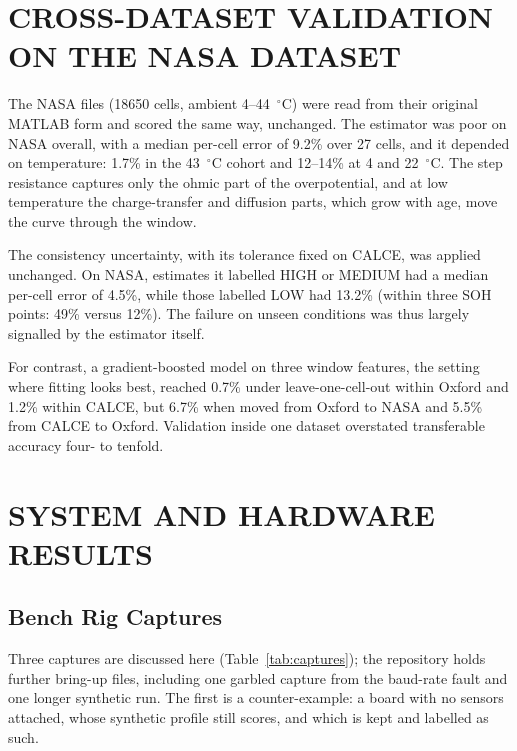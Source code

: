 \section{CROSS-DATASET VALIDATION ON THE NASA DATASET}
\label{sec:res-xds}

The NASA files (18650 cells, ambient 4--44~$^\circ$C) were read from their original MATLAB form and scored the same way, unchanged. The estimator was poor on NASA overall, with a median per-cell error of 9.2\% over 27 cells, and it depended on temperature: 1.7\% in the 43~$^\circ$C cohort and 12--14\% at 4 and 22~$^\circ$C. The step resistance captures only the ohmic part of the overpotential, and at low temperature the charge-transfer and diffusion parts, which grow with age, move the curve through the window.

The consistency uncertainty, with its tolerance fixed on CALCE, was applied unchanged. On NASA, estimates it labelled HIGH or MEDIUM had a median per-cell error of 4.5\%, while those labelled LOW had 13.2\% (within three SOH points: 49\% versus 12\%). The failure on unseen conditions was thus largely signalled by the estimator itself.

For contrast, a gradient-boosted model on three window features, the setting where fitting looks best, reached 0.7\% under leave-one-cell-out within Oxford and 1.2\% within CALCE, but 6.7\% when moved from Oxford to NASA and 5.5\% from CALCE to Oxford. Validation inside one dataset overstated transferable accuracy four- to tenfold.

\section{SYSTEM AND HARDWARE RESULTS}
\label{sec:res-system}

\subsection{Bench Rig Captures}

Three captures are discussed here (Table~\ref{tab:captures}); the repository holds further bring-up files, including one garbled capture from the baud-rate fault and one longer synthetic run. The first is a counter-example: a board with no sensors attached, whose synthetic profile still scores, and which is kept and labelled as such.

